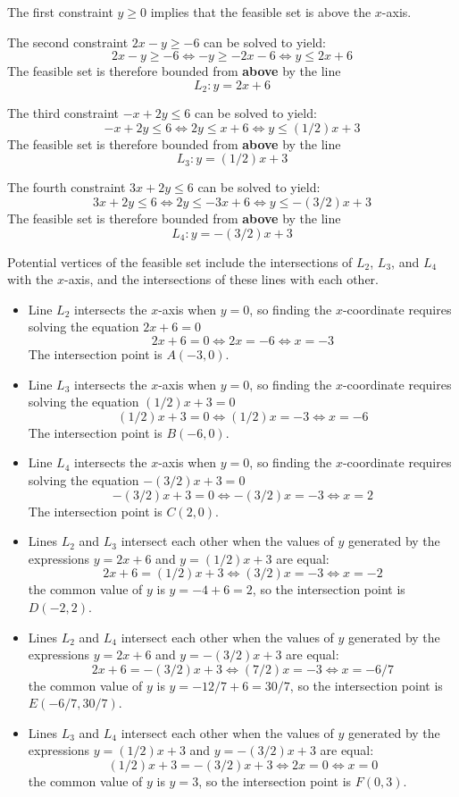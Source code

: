 \documentclass{article}
\begin{document}
The first constraint \(y \geq 0\) implies that the feasible set is above the \(x\)-axis.

The second constraint \(2x - y \geq -6\) can be solved to yield:
\[2x - y \geq -6 \iff -y \geq -2x - 6 \iff y \leq 2x + 6\]
The feasible set is therefore bounded from {\bf above} by the line
\[L_2 : y = 2x + 6\]

The third constraint \(-x + 2y \leq 6\) can be solved to yield:
\[-x + 2y \leq 6 \iff 2y \leq x + 6 \iff y \leq (1/2)x + 3\]
The feasible set is therefore bounded from {\bf above} by the line
\[L_3 : y = (1/2)x + 3\]

The fourth constraint \(3x + 2y \leq 6\) can be solved to yield:
\[3x + 2y \leq 6 \iff 2y \leq -3x + 6 \iff y \leq -(3/2)x + 3\]
The feasible set is therefore bounded from {\bf above} by the line
\[L_4 : y = -(3/2)x + 3\]

Potential vertices of the feasible set include the intersections of \(L_2\), \(L_3\), and \(L_4\) with the \(x\)-axis, and the intersections of these lines with each other.
\begin{itemize}
\item Line \(L_2\) intersects the \(x\)-axis when \(y = 0\), so finding the \(x\)-coordinate requires solving the equation \(2x + 6 = 0\)
\[2x + 6 = 0 \iff 2x = -6 \iff x = -3\] 
The intersection point is \(A(-3, 0)\).
\item Line \(L_3\) intersects the \(x\)-axis when \(y = 0\), so finding the \(x\)-coordinate requires solving the equation \((1/2)x + 3 = 0\)
\[(1/2)x + 3 = 0 \iff (1/2)x = -3 \iff x = -6\] 
The intersection point is \(B(-6, 0)\). 
\item Line \(L_4\) intersects the \(x\)-axis when \(y = 0\), so finding the \(x\)-coordinate requires solving the equation \(-(3/2)x + 3 = 0\)
\[-(3/2)x + 3 = 0 \iff -(3/2)x = -3 \iff x = 2\]
The intersection point is \(C(2, 0)\).   
\item Lines \(L_2\) and \(L_3\) intersect each other when the values of \(y\) generated by the expressions \(y = 2x + 6\) and \(y = (1/2)x + 3\) are equal:
\[2x + 6 = (1/2)x + 3 \iff (3/2)x = -3 \iff x = -2\]      
the common value of \(y\) is \(y = -4 + 6 = 2\), so the intersection point is \(D(-2, 2)\). 
\item Lines \(L_2\) and \(L_4\) intersect each other when the values of \(y\) generated by the expressions \(y = 2x + 6\) and \(y = -(3/2)x + 3\) are equal:
\[2x + 6 = -(3/2)x + 3 \iff (7/2)x = -3 \iff x = -6/7\]
the common value of \(y\) is \(y = -12/7 + 6 = 30/7\), so the intersection point is \(E(-6/7, 30/7)\).
\item Lines \(L_3\) and \(L_4\) intersect each other when the values of \(y\) generated by the expressions \(y = (1/2)x + 3\) and \(y = -(3/2)x + 3\) are equal:  
\[(1/2)x + 3 = -(3/2)x + 3 \iff 2x = 0 \iff x = 0\]
the common value of \(y\) is \(y = 3\), so the intersection point is \(F(0, 3)\).
\end{itemize}
\end{document}
